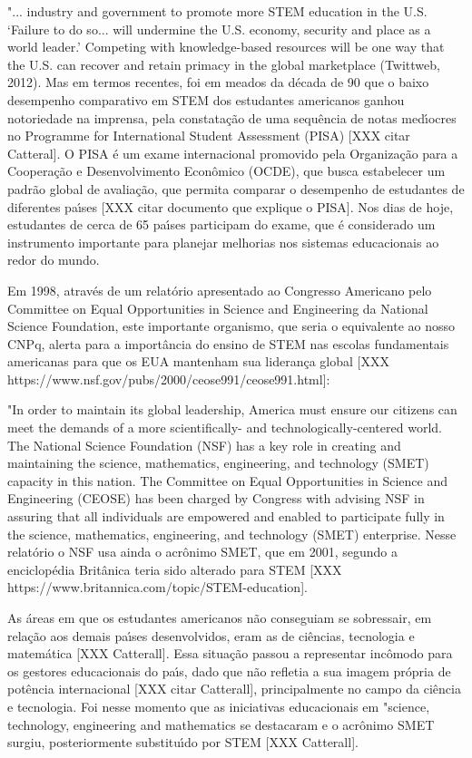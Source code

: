 \documentclass[
12pt,		%
openright,	%
twoside,  %
a4paper,			%
chapter=TITLE,		%
english,			%
french,				%
spanish,			%
brazil				%
]{USPSC-classe/USPSC}
\begin{document}
"... industry and government to promote more STEM education in the U.S. ‘Failure to do so... will undermine the U.S. economy, security and place as a world leader.’ Competing with knowledge-based resources will be one way that the U.S. can recover and retain primacy in the global marketplace (Twittweb, 2012).
Mas em termos recentes, foi em meados da d\'ecada de 90 que o baixo desempenho comparativo em STEM dos estudantes americanos ganhou notoriedade na imprensa, pela constata\c{c}\~ao de uma sequ\^encia de notas med\'{\i}ocres no Programme for International Student Assessment (PISA) [XXX citar Catteral]. O PISA \'e um exame internacional promovido pela Organiza\c{c}\~ao para a Coopera\c{c}\~ao e Desenvolvimento Econ\^omico (OCDE), que busca estabelecer um padr\~ao global de avalia\c{c}\~ao, que permita comparar o desempenho de estudantes de diferentes pa\'{\i}ses [XXX citar documento que explique o PISA]. Nos dias de hoje, estudantes de cerca de 65 pa\'{\i}ses participam do exame, que \'e considerado um instrumento importante para planejar melhorias nos sistemas educacionais ao redor do mundo.


Em 1998, atrav\'es de um relat\'orio apresentado ao Congresso Americano pelo Committee on Equal Opportunities in Science and Engineering da National Science Foundation, este importante organismo, que seria o equivalente ao nosso CNPq, alerta para a import\^ancia do ensino de STEM nas escolas fundamentais americanas para que os EUA mantenham sua lideran\c{c}a global [XXX https://www.nsf.gov/pubs/2000/ceose991/ceose991.html]:


"In order to maintain its global leadership, America must ensure our citizens can meet the demands of a more scientifically- and technologically-centered world. The National Science Foundation (NSF) has a key role in creating and maintaining the science, mathematics, engineering, and technology (SMET) capacity in this nation. The Committee on Equal Opportunities in Science and Engineering (CEOSE) has been charged by Congress with advising NSF in assuring that all individuals are empowered and enabled to participate fully in the science, mathematics, engineering, and technology (SMET) enterprise.
Nesse relat\'orio o NSF usa ainda o acr\^onimo SMET, que em 2001, segundo a enciclop\'edia Brit\^anica teria sido alterado para STEM [XXX https://www.britannica.com/topic/STEM-education].


As \'areas em que os estudantes americanos n\~ao conseguiam se sobressair, em rela\c{c}\~ao aos demais pa\'{\i}ses desenvolvidos, eram as de ci\^encias, tecnologia e matem\'atica [XXX Catterall]. Essa situa\c{c}\~ao passou a representar inc\^omodo para os gestores educacionais do pa\'{\i}s, dado que n\~ao refletia a sua imagem pr\'opria de pot\^encia internacional [XXX citar Catterall], principalmente no campo da ci\^encia e tecnologia. Foi nesse momento que as iniciativas educacionais em "science, technology, engineering and mathematics se destacaram e o acr\^onimo SMET surgiu, posteriormente substitu\'{\i}do por STEM [XXX  Catterall].
\end{document}
